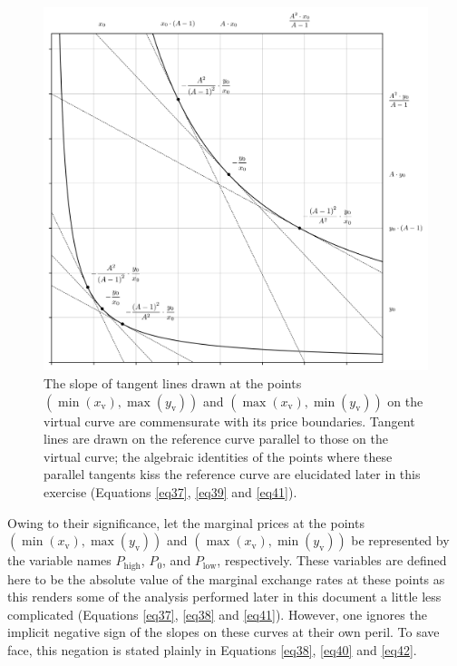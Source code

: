 \documentclass{article}
\begin{document}
\begin{figure}[ht]
    \centering
    \includegraphics[width=\textwidth]{fig11.png}
    \captionsetup{
        justification=raggedright,
        singlelinecheck=false,
        font=small,
        labelfont=bf,
        labelsep=quad,
        format=plain
    }
    \caption{The slope of tangent lines drawn at the points $\left(\min \left( x_{\text{v}} \right), \max \left( y_{\text{v}} \right) \right)$ and $\left(\max \left( x_{\text{v}} \right), \min \left( y_{\text{v}} \right) \right)$ on the virtual curve are commensurate with its price boundaries. Tangent lines are drawn on the reference curve parallel to those on the virtual curve; the algebraic identities of the points where these parallel tangents kiss the reference curve are elucidated later in this exercise (Equations \ref{eq37}, \ref{eq39} and \ref{eq41}).}
    \label{fig11}
\end{figure}

Owing to their significance, let the marginal prices at the points $\left(\min \left( x_{\text{v}} \right), \max \left( y_{\text{v}} \right) \right)$ and $\left(\max \left( x_{\text{v}} \right), \min \left( y_{\text{v}} \right) \right)$ be represented by the variable names $P_{\text{high}}$, $P_{0}$, and $P_{\text{low}}$, respectively. These variables are defined here to be the absolute value of the marginal exchange rates at these points as this renders some of the analysis performed later in this document a little less complicated (Equations \ref{eq37}, \ref{eq38} and \ref{eq41}). However, one ignores the implicit negative sign of the slopes on these curves at their own peril. To save face, this negation is stated plainly in Equations \ref{eq38}, \ref{eq40} and \ref{eq42}. 
\end{document}
